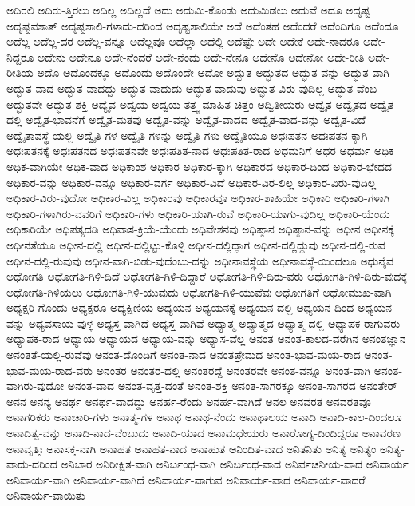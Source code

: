 {ಅದಿರಲಿ
ಅದಿರು-ತ್ತಿರಲು
ಅದಿಲ್ಲ
ಅದಿಲ್ಲದೆ
ಅದು
ಅದುಮಿ-ಕೊಂಡು
ಅದುಮಿಡಲು
ಅದುವೆ
ಅದೂ
ಅದೃಷ್ಟ
ಅದೃಷ್ಟವಶಾತ್
ಅದೃಷ್ಟಶಾಲಿ-ಗಳಾದು-ದರಿಂದ
ಅದೃಷ್ಟಶಾಲಿಯೇ
ಅದೆ
ಅದೆಂತಹ
ಅದೆಂದರೆ
ಅದೆಂದಿಗೂ
ಅದೆಂದೂ
ಅದೆಲ್ಲ
ಅದೆಲ್ಲ-ದರ
ಅದೆಲ್ಲ-ವನ್ನೂ
ಅದೆಲ್ಲವೂ
ಅದೆಲ್ಲಾ
ಅದೆಲ್ಲಿ
ಅದೆಷ್ಟೇ
ಅದೇ
ಅದೇಕೆ
ಅದೇ-ನಾದರೂ
ಅದೇ-ನಿದ್ದರೂ
ಅದೇನು
ಅದೇನೂ
ಅದೇ-ನೆಂದರೆ
ಅದೇ-ನೆಂದು
ಅದೇ-ನೇನೂ
ಅದೇನೊ
ಅದೇನೋ
ಅದೇ-ರೀತಿ
ಅದೇ-ರೀತಿಯ
ಅದೊ
ಅದೊಂದಕ್ಕೂ
ಅದೊಂದು
ಅದೊಂದೇ
ಅದೋ
ಅದ್ಭುತ
ಅದ್ಭುತದ
ಅದ್ಭುತ-ವನ್ನು
ಅದ್ಭುತ-ವಾಗಿ
ಅದ್ಭುತ-ವಾದ
ಅದ್ಭುತ-ವಾದದ್ದು
ಅದ್ಭುತ-ವಾದುದು
ಅದ್ಭುತ-ವಾದುವು
ಅದ್ಭುತ-ವಿರು-ವುದಿಲ್ಲ
ಅದ್ಭುತ-ವೆಂಬ
ಅದ್ಭುತವೇ
ಅದ್ಭುತ-ಶಕ್ತಿ
ಅದ್ಯೈವ
ಅದ್ವಯ
ಅದ್ವಯ-ತತ್ತ್ವ-ಮಾಹಿತ-ಚಿತ್ತಂ
ಅದ್ವಿತೀಯರು
ಅದ್ವೈತ
ಅದ್ವೈತದ
ಅದ್ವೈತ-ದಲ್ಲಿ
ಅದ್ವೈತ-ಭಾವನೆಗೆ
ಅದ್ವೈತ-ಮತವು
ಅದ್ವೈತ-ವನ್ನು
ಅದ್ವೈತ-ವಾದದ
ಅದ್ವೈತ-ವಾದ-ವನ್ನು
ಅದ್ವೈತ-ವಿದೆ
ಅದ್ವೈತಾವಸ್ಥೆ-ಯಲ್ಲಿ
ಅದ್ವೈತಿ-ಗಳ
ಅದ್ವೈತಿ-ಗಳನ್ನು
ಅದ್ವೈತಿ-ಗಳು
ಅದ್ವೈತಿಯೂ
ಅಧಃಪತನ
ಅಧಃಪತನ-ಕ್ಕಾಗಿ
ಅಧಃಪತನಕ್ಕೆ
ಅಧಃಪತನದ
ಅಧಃಪತನವೇ
ಅಧಃಪತಿತ-ನಾದ
ಅಧಃಪತಿತ-ರಾದ
ಅಧಮನಿಗೆ
ಅಧರ
ಅಧರ್ಮ
ಅಧಿಕ
ಅಧಿಕ-ವಾಗಿಯೇ
ಅಧಿಕ-ವಾದ
ಅಧಿಕಾಂಶ
ಅಧಿಕಾರ
ಅಧಿಕಾರ-ಕ್ಕಾಗಿ
ಅಧಿಕಾರದ
ಅಧಿಕಾರ-ದಿಂದ
ಅಧಿಕಾರ-ಭೇದದ
ಅಧಿಕಾರ-ವನ್ನು
ಅಧಿಕಾರ-ವನ್ನೂ
ಅಧಿಕಾರ-ವರ್ಗ
ಅಧಿಕಾರ-ವಿದೆ
ಅಧಿಕಾರ-ವಿರ-ಲಿಲ್ಲ
ಅಧಿಕಾರ-ವಿರು-ವುದಿಲ್ಲ
ಅಧಿಕಾರ-ವಿರು-ವುದೋ
ಅಧಿಕಾರ-ವಿಲ್ಲ
ಅಧಿಕಾರವು
ಅಧಿಕಾರವೂ
ಅಧಿಕಾರ-ಶಾಹಿಯೇ
ಅಧಿಕಾರಿ
ಅಧಿಕಾರಿ-ಗಳಾಗಿ
ಅಧಿಕಾರಿ-ಗಳಾಗಿರು-ವವರಿಗೆ
ಅಧಿಕಾರಿ-ಗಳು
ಅಧಿಕಾರಿ-ಯಾಗಿ-ರುವೆ
ಅಧಿಕಾರಿ-ಯಾಗು-ವುದಿಲ್ಲ
ಅಧಿಕಾರಿ-ಯೆಂದು
ಅಧಿಕಾರಿಯೇ
ಅಧಿಪತ್ಯದಡಿ
ಅಧಿವಾಸ-ಕ್ರಿಯೆ-ಯೆಂದು
ಅಧಿವೇಶನವು
ಅಧಿಷ್ಠಾನ
ಅಧಿಷ್ಠಾನ-ವನ್ನು
ಅಧೀನ
ಅಧೀನಕ್ಕೆ
ಅಧೀನತೆಯೂ
ಅಧೀನ-ದಲ್ಲಿ
ಅಧೀನ-ದಲ್ಲಿಟ್ಟು-ಕೊಳ್ಳಿ
ಅಧೀನ-ದಲ್ಲಿದ್ದಾಗ
ಅಧೀನ-ದಲ್ಲಿದ್ದುವು
ಅಧೀನ-ದಲ್ಲಿ-ರುವ
ಅಧೀನ-ದಲ್ಲಿ-ರುವುವು
ಅಧೀನ-ವಾಗಿ-ಬಿಡು-ವುದೆಂಬು-ದನ್ನು
ಅಧೀನಾವಸ್ಥೆಯ
ಅಧೀನಾವಸ್ಥೆ-ಯಿಂದಲೂ
ಅಧುನೈವ
ಅಧೋಗತಿ
ಅಧೋಗತಿ-ಗಿಳಿ-ದಿದೆ
ಅಧೋಗತಿ-ಗಿಳಿ-ದಿದ್ದಾರೆ
ಅಧೋಗತಿ-ಗಿಳಿ-ದಿರು-ವರು
ಅಧೋಗತಿ-ಗಿಳಿ-ದಿರು-ವುದಕ್ಕೆ
ಅಧೋಗತಿ-ಗಿಳಿಯಲು
ಅಧೋಗತಿ-ಗಿಳಿ-ಯುವುದು
ಅಧೋಗತಿ-ಗಿಳಿ-ಯುವೆವು
ಅಧೋಗತಿಗೆ
ಅಧೋಮುಖ-ವಾಗಿ
ಅಧ್ಯಕ್ಷರಿ-ಗೊಂದು
ಅಧ್ಯಕ್ಷರೂ
ಅಧ್ಯಕ್ಷಿಣಿಯ
ಅಧ್ಯಯನ
ಅಧ್ಯಯನಕ್ಕೆ
ಅಧ್ಯಯನ-ದಲ್ಲಿ
ಅಧ್ಯಯನ-ದಿಂದ
ಅಧ್ಯಯನ-ವನ್ನು
ಅಧ್ಯವಸಾಯ-ವುಳ್ಳ
ಅಧ್ಯಸ್ತ-ವಾಗಿದೆ
ಅಧ್ಯಸ್ತ-ವಾಗಿವೆ
ಅಧ್ಯಾತ್ಮ
ಅಧ್ಯಾತ್ಮದ
ಅಧ್ಯಾತ್ಮ-ದಲ್ಲಿ
ಅಧ್ಯಾಪಕ-ರಾಗುವರು
ಅಧ್ಯಾಪಕ-ರಾದ
ಅಧ್ಯಾಯ
ಅಧ್ಯಾಯದ
ಅಧ್ಯಾಯ-ವನ್ನು
ಅಧ್ಯಾಸ-ವೆಲ್ಲ
ಅನಂತ
ಅನಂತ-ಕಾಲದ-ವರೆಗಿನ
ಅನಂತಜ್ಞಾನ
ಅನಂತತೆ-ಯಲ್ಲಿ-ರುವೆವು
ಅನಂತ-ದೊಂದಿಗೆ
ಅನಂತ-ನಾದ
ಅನಂತಪ್ರೇಮದ
ಅನಂತ-ಭಾವ-ಮಯ-ರಾದ
ಅನಂತ-ಭಾವ-ಮಯ-ರಾದ-ವರು
ಅನಂತರ
ಅನಂತರ-ದಲ್ಲಿ
ಅನಂತರದ್ದೆ
ಅನಂತರವೇ
ಅನಂತ-ವನ್ನೂ
ಅನಂತ-ವಾಗಿ
ಅನಂತ-ವಾಗಿರು-ವುದೋ
ಅನಂತ-ವಾದ
ಅನಂತ-ವೃತ್ತ-ದಂತೆ
ಅನಂತ-ಶಕ್ತಿ
ಅನಂತ-ಸಾಗರಕ್ಕೂ
ಅನಂತ-ಸಾಗರದ
ಅನಂತೇರ್
ಅನನ
ಅನನ್ಯ
ಅನರ್ಥ
ಅನರ್ಥ-ವಾದದ್ದು
ಅನರ್ಹ-ರೆಂದು
ಅನರ್ಹ-ವಾಗಿದೆ
ಅನಲ
ಅನವರತ
ಅನವರತವೂ
ಅನಾಗರಿಕರು
ಅನಾಚಾರಿ-ಗಳು
ಅನಾತ್ಮ-ಗಳ
ಅನಾಥ
ಅನಾಥ-ನೆಂದು
ಅನಾಥಾಲಯ
ಅನಾದಿ
ಅನಾದಿ-ಕಾಲ-ದಿಂದಲೂ
ಅನಾದಿತ್ವ-ವನ್ನು
ಅನಾದಿ-ನಾದ-ವೆಂಬುದು
ಅನಾದಿ-ಯಾದ
ಅನಾಮಧೇಯರು
ಅನಾರೋಗ್ಯ-ದಿಂದಿದ್ದರೂ
ಅನಾವರಣ
ಅನಾವೃತ್ತಿಃ
ಅನಾಸಕ್ತ-ನಾಗಿ
ಅನಾಹತ
ಅನಾಹತ-ನಾದ
ಅನಾಹುತ
ಅನಿಂದಿತ-ವಾದ
ಅನಿತನಿತು
ಅನಿತ್ಯ
ಅನಿತ್ಯಂ
ಅನಿತ್ಯ-ವಾದು-ದರಿಂದ
ಅನಿಬಾರ
ಅನಿರೀಕ್ಷಿತ-ವಾಗಿ
ಅನಿರ್ಬಂಧ-ವಾಗಿ
ಅನಿರ್ಬಂಧ-ವಾದ
ಅನಿರ್ವಚನೀಯ-ವಾದ
ಅನಿವಾರ್ಯ
ಅನಿವಾರ್ಯ-ವಾಗಿ
ಅನಿವಾರ್ಯ-ವಾಗಿದೆ
ಅನಿವಾರ್ಯ-ವಾಗುವ
ಅನಿವಾರ್ಯ-ವಾದ
ಅನಿವಾರ್ಯ-ವಾದರೆ
ಅನಿವಾರ್ಯ-ವಾಯಿತು
}
